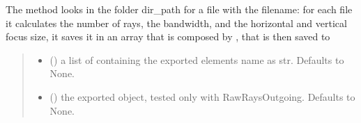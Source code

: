 \documentclass[letterpaper,10pt,english]{sphinxmanual}
\begin{document}
\begin{fulllineitems}
\begin{fulllineitems}
\label{\detokenize{code_documentation:raypyng.postprocessing.PostProcess.postprocess_RawRays}}
\pysigstartsignatures
{}
\pysigstopsignatures
\sphinxAtStartPar
The method looks in the folder dir\_path for a file with the filename:
for each file it calculates the number of rays, the bandwidth, and the horizontal and vertical focus size,
it saves it in an array that is composed by , that is then saved to
\begin{quote}\begin{description}
\begin{itemize}
\item {} 
\sphinxAtStartPar
{} (\sphinxstyleliteralemphasis{\sphinxupquote{, }}) \textendash{} a list of containing the exported elements name as str. Defaults to None.

\item {} 
\sphinxAtStartPar
{} (\sphinxstyleliteralemphasis{\sphinxupquote{, }}) \textendash{} the exported object, tested only with RawRaysOutgoing. Defaults to None.


\end{itemize}
\end{description}
\end{quote}
\end{fulllineitems}
\end{fulllineitems}
\end{document}
